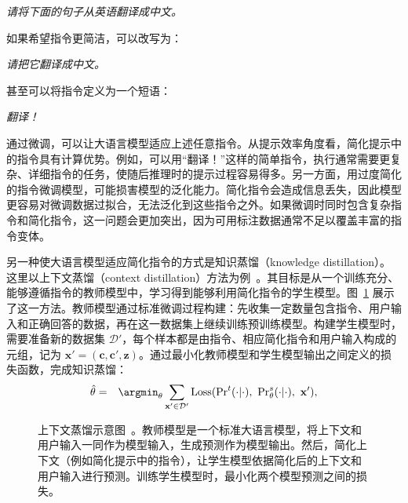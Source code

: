 \vspace{1em}
\hspace{4em} \textit{请将下面的句子从英语翻译成中文。}
\vspace{1em}

\noindent 如果希望指令更简洁，可以改写为：

\vspace{1em}
\hspace{4em} \textit{请把它翻译成中文。}
\vspace{1em}

\noindent 甚至可以将指令定义为一个短语：

\vspace{1em}
\hspace{4em} \textit{翻译！}
\vspace{1em}

通过微调，可以让大语言模型适应上述任意指令。从提示效率角度看，简化提示中的指令具有计算优势。例如，可以用“翻译！”这样的简单指令，执行通常需要更复杂、详细指令的任务，使随后推理时的提示过程容易得多。另一方面，用过度简化的指令微调模型，可能损害模型的泛化能力。简化指令会造成信息丢失，因此模型更容易对微调数据过拟合，无法泛化到这些指令之外。如果微调时同时包含复杂指令和简化指令，这一问题会更加突出，因为可用标注数据通常不足以覆盖丰富的指令变体。

另一种使大语言模型适应简化指令的方式是知识蒸馏（knowledge distillation）。这里以上下文蒸馏（context distillation）方法为例~\cite{snell-etal:2022learning}。其目标是从一个训练充分、能够遵循指令的教师模型中，学习得到能够利用简化指令的学生模型。图~\ref{fig:context-distillation} 展示了这一方法。教师模型通过标准微调过程构建：先收集一定数量包含指令、用户输入和正确回答的数据，再在这一数据集上继续训练预训练模型。构建学生模型时，需要准备新的数据集 $\mathcal{D}'$，每个样本都是由指令、相应简化指令和用户输入构成的元组，记为 $\mathbf{x}' = (\mathbf{c}, \mathbf{c}', \mathbf{z})$。通过最小化教师模型和学生模型输出之间定义的损失函数，完成知识蒸馏：
\begin{eqnarray}
\hat{\theta} & = & \argmin_{\theta} \sum_{\mathbf{x}' \in \mathcal{D}'} \mathrm{Loss}(\mathrm{Pr}^{t}(\cdot|\cdot),\ \mathrm{Pr}_{\theta}^{s}(\cdot|\cdot),\ \mathbf{x}'),
\end{eqnarray}

\begin{figure}[!t]
\centering

\caption{上下文蒸馏示意图~\cite{snell-etal:2022learning}。教师模型是一个标准大语言模型，将上下文和用户输入一同作为模型输入，生成预测作为模型输出。然后，简化上下文（例如简化提示中的指令），让学生模型依据简化后的上下文和用户输入进行预测。训练学生模型时，最小化两个模型预测之间的损失。}
\label{fig:context-distillation}
\end{figure}

